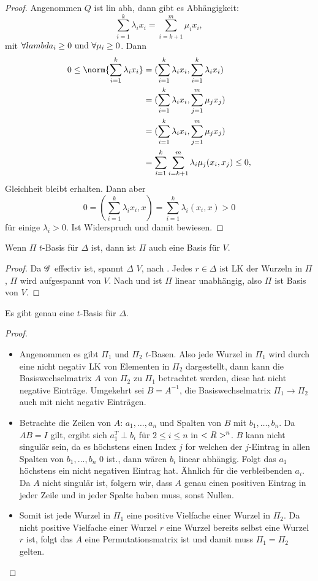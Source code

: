 \begin{proof}
	Angenommen $Q$ ist lin abh, dann gibt es Abhängigkeit:
	\[
		\sum_{i=1}^k \lambda_i x_i = \sum_{i=k+1}^m \mu_i x_i,
	\]
	mit $\forall lambda_i \ge 0 \text{ und } \forall \mu_i \ge 0$. Dann
	\begin{align*}
		0 \le \norm{\sum_{i=1}^k \lambda_i x_i} &= (\sum_{i=1}^k \lambda_i x_i, \sum_{i=1}^k \lambda_i x_i)\\
		&= (\sum_{i=1}^k \lambda_i x_i, \sum_{j=1}^m \mu_j x_j)\\
		&= (\sum_{i=1}^k \lambda_i x_i, \sum_{j=1}^m \mu_j x_j)\\
		&= \sum_{i=1}^k \sum_{i=k+1}^m \lambda_i \mu_j (x_i,x_j) \le 0,
	\end{align*}
	Gleichheit bleibt erhalten. Dann aber
	\[
		0 = (\sum_{i=1}^k \lambda_i x_i,x) = \sum_{i=1}^k \lambda_i (x_i,x) >0
	\]
	für einige $\lambda_i > 0$. Ist Widerspruch und damit bewiesen.
\end{proof}
\begin{theorem}
	Wenn $\Pi$ $t$-Basis für $\Delta$ ist, dann ist $\Pi$ auch eine Basis für $V$.
\end{theorem}
\begin{proof}
	Da $\mathscr G$ effectiv ist, spannt $\Delta$ $V$, nach . Jedes $r \in \Delta$ ist LK der Wurzeln in $\Pi$, $\Pi$ wird aufgespannt von $V$. Nach  und  ist $\Pi$ linear unabhängig, also $\Pi$ ist Basis von $V$.
\end{proof}
\begin{proposition}
	Es gibt genau eine $t$-Basis für $\Delta$.
\end{proposition}
\begin{proof}
	\begin{itemize}
		\item Angenommen es gibt $\Pi_1$ und $\Pi_2$ $t$-Basen. Also jede Wurzel in $\Pi_1$ wird durch eine nicht negativ LK von Elementen in $\Pi_2$ dargestellt, dann kann die Basiswechselmatrix $A$ von $\Pi_2$ zu $\Pi_1$ betrachtet werden, diese hat nicht negative Einträge. Umgekehrt sei $B = A^{-1}$, die Basiswechselmatrix $\Pi_1 \to \Pi_2$ auch mit nicht negativ Einträgen.
		\item Betrachte die Zeilen von $A$: $a_1, \dots, a_n$ und Spalten von $B$ mit $b_1, \dots, b_n$. Da $AB = I$ gilt, ergibt sich $a_1^T \perp b_i$ für $2 \le i \le n$ in $<R>^n$. $B$ kann nicht singulär sein, da es höchstens einen Index $j$ for welchen der $j$-Eintrag in allen Spalten von $b_1, \dots, b_n$ 0 ist., dann wären $b_i$ linear abhängig. Folgt das $a_1$ höchstens ein nicht negativen Eintrag hat. Ähnlich für die verbleibenden $a_i$. Da $A$ nicht singulär ist, folgern wir, dass $A$ genau einen positiven Eintrag in jeder Zeile und in jeder Spalte haben muss, sonst Nullen.
		\item Somit ist jede Wurzel in $\Pi_1$ eine positive Vielfache einer Wurzel in $\Pi_2$. Da nicht positive Vielfache einer Wurzel $r$ eine Wurzel bereits selbst eine Wurzel $r$ ist, folgt das $A$ eine Permutationsmatrix ist und damit muss $\Pi_1 = \Pi_2$ gelten. 
	\end{itemize}
	
\end{proof}

